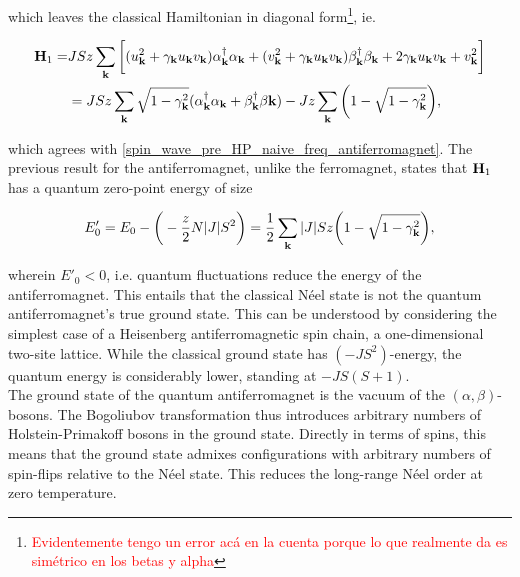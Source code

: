 which leaves the classical Hamiltonian in diagonal form\footnote{
\textcolor{red}{Evidentemente tengo un error acá en la cuenta porque lo que realmente da es simétrico en los betas y alpha}
}, ie.

\begin{equation}
\begin{split}
     {\bf H}_1 =& JSz \sum_{{\bf k}} \bigg[ (u^2_{{\bf k}} + \gamma_{{\bf k}} u_{{\bf k}} v_{{\bf k}} )\alpha^\dagger_{{\bf k}} \alpha_{{\bf k}} + (v_{{\bf k}}^2 + \gamma_{{\bf k}} u_{{\bf k}} v_{{\bf k}})\beta^\dagger_{{\bf k}} \beta_{{\bf k}} + 2 \gamma_{{\bf k}} u_{{\bf k}} v_{{\bf k}} + v^2_{{\bf k}} \bigg] \\
     &= JSz \sum_{{\bf k}} \sqrt{1-\gamma^2_{{\bf k}}} (\alpha^\dagger_{{\bf k}} \alpha_{{\bf k}} + \beta^\dagger_{{\bf k}} \beta{{\bf k}}) - Jz \sum_{{\bf k}} \bigg(1- \sqrt{1-\gamma^2_{{\bf k}}}\bigg),
\end{split}
\end{equation}

which agrees with \cref{spin_wave_pre_HP_naive_freq_antiferromagnet}. The previous result for the antiferromagnet, unlike the ferromagnet, states that ${\bf H}_1$ has a quantum zero-point energy of size 

\begin{equation}
    E'_0 = E_0 - \bigg(-\frac{z}{2} N |J| S^2\bigg) = \frac{1}{2} \sum_{{\bf k}} |J| Sz \bigg(1- \sqrt{1-\gamma^2_{{\bf k}}}\bigg),
\end{equation}

wherein $E'_0 < 0$, i.e. quantum fluctuations reduce the energy of the antiferromagnet. This entails that the classical Néel state is not the quantum antiferromagnet's true ground state. This can be understood by considering the simplest case of a Heisenberg antiferromagnetic spin chain, a one-dimensional two-site lattice. While the classical ground state has $(-JS^2)$-energy, the quantum energy is considerably lower, standing at $-JS(S+1)$. \\

The ground state of the quantum antiferromagnet is the vacuum of the ${(\alpha, \beta)}$-bosons. The Bogoliubov transformation thus introduces arbitrary numbers of Holstein-Primakoff bosons in the ground state. Directly in terms of spins, this means that the ground state admixes configurations with arbitrary numbers of spin-flips relative to the Néel state. This reduces the long-range Néel order at zero temperature. \\

